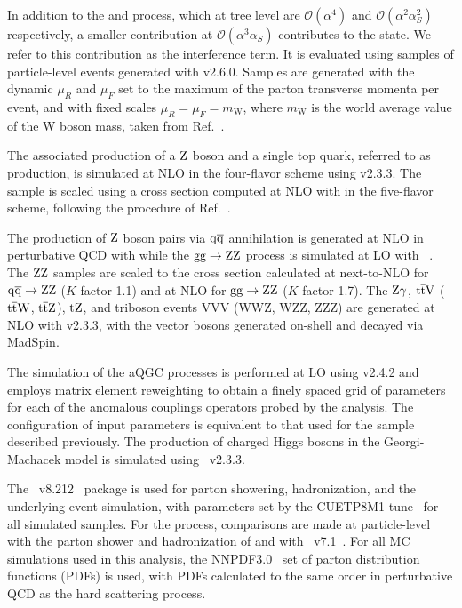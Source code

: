 In addition to the \EWWZ and \QCDWZ process, which at tree level are 
$\mathcal{O}(\alpha^4)$ and $\mathcal{O}(\alpha^2\alpha_{S}^2)$ respectively,
a smaller contribution at $\mathcal{O}(\alpha^3\alpha_{S})$ 
contributes to the \WZjj state. We refer to this contribution as the 
interference term. It is evaluated using samples of particle-level
events generated with \MG v2.6.0. Samples are generated with the dynamic $\mu_{R}$
and $\mu_{F}$ set to the maximum of the parton transverse momenta per event, and with fixed
scales $\mu_{R} = \mu_{F} = m_{\mathrm{W}}$, where $m_{\mathrm{W}}$ is the world average value of the 
W boson mass, taken from Ref.~\cite{Tanabashi:2018oca}.

The associated production of a $\mathrm{Z}$ boson and a single top quark, referred to as \tZq production,
is simulated at NLO in the four-flavor scheme using \MG v2.3.3. 
The sample is scaled using a cross section computed at NLO with \MG in the five-flavor scheme, 
following the procedure of Ref.~\cite{Sirunyan:2017nbr}.

The production of $\mathrm{Z}$ boson pairs via $\mathrm{q}\overline{\mathrm{q}}$ annihilation is generated at NLO in perturbative QCD with
 while the $\mathrm{g}\mathrm{g} \to \mathrm{Z}\mathrm{Z}$ process is simulated at LO with ~\cite{Campbell:2011bn}.
The $\mathrm{Z}\mathrm{Z}$ samples are scaled to the cross section calculated at next-to-NLO
for $\mathrm{q}\overline{\mathrm{q}} \to \mathrm{Z}\mathrm{Z}$ \cite{Cascioli:2014yka} ($K$ factor 1.1)
and at NLO for $\mathrm{g}\mathrm{g} \to \mathrm{Z}\mathrm{Z}$ \cite{Caola:2015psa} ($K$ factor 1.7).
The $\mathrm{Z}\gamma$, ${\mathrm{t}\overline{\mathrm{t}}}\text{V}$ (${\mathrm{t}\overline{\mathrm{t}}}\mathrm{W}$, ${\mathrm{t}\overline{\mathrm{t}}}\mathrm{Z}$), $\mathrm{t}\mathrm{Z}$, 
and triboson events VVV (WWZ, WZZ, ZZZ)  
are generated at NLO with \MG v2.3.3, with the vector bosons generated on-shell
and decayed via {\sc MadSpin}.

The simulation of the aQGC processes is performed at LO using \MG v2.4.2 and employs matrix element 
reweighting to obtain a finely spaced grid of parameters for each of the anomalous couplings
operators probed by the analysis. The configuration of input parameters is equivalent to that used for the 
\EWWZ sample described previously. 
The production of charged Higgs bosons in the Georgi-Machacek model
is simulated using \MG~v2.3.3.

The \PYTHIA~v8.212~\cite{Sjostrand:2006za,Sjostrand:2015} package
is used for parton showering, hadronization, and
the underlying event simulation, with parameters set by the CUETP8M1
tune~\cite{Khachatryan:2015pea} for all simulated samples.
For the \EWWZ process, comparisons are made at particle-level with the parton shower
and hadronization 
of \Sherpa and with \Herwig~v7.1~\cite{Bellm:2015jjp,Bahr:2008pv}.
For all MC simulations used in this analysis, the NNPDF3.0~\cite{NNPDF2015} set of
parton distribution functions (PDFs) is used, with PDFs calculated to the same
order in perturbative QCD as the hard scattering process. 

